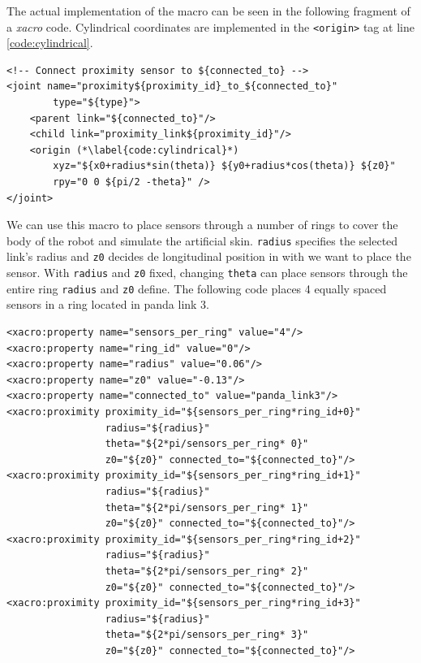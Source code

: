 The actual implementation of the macro can be seen in the following fragment of a \textit{xacro} code. Cylindrical coordinates are implemented in the \lstinline[columns=fixed]{<origin>} tag at line \ref{code:cylindrical}.

\begin{lstlisting}[caption={$<$joint$>$ element in the proximity macro, where the position of new sensor is set up given some arguments.},captionpos=b]
<!-- Connect proximity sensor to ${connected_to} -->
<joint name="proximity${proximity_id}_to_${connected_to}"
        type="${type}">
    <parent link="${connected_to}"/>
    <child link="proximity_link${proximity_id}"/>
    <origin (*\label{code:cylindrical}*)
        xyz="${x0+radius*sin(theta)} ${y0+radius*cos(theta)} ${z0}"
        rpy="0 0 ${pi/2 -theta}" />
</joint>
\end{lstlisting}

We can use this macro to place sensors through a number of rings to cover the body of the robot and simulate the artificial skin. \lstinline[columns=fixed]{radius} specifies the selected link's radius and \lstinline[columns=fixed]{z0} decides de longitudinal position in with we want to place the sensor. With \lstinline[columns=fixed]{radius} and \lstinline[columns=fixed]{z0} fixed, changing \lstinline[columns=fixed]{theta} can place sensors through the entire ring \lstinline[columns=fixed]{radius} and \lstinline[columns=fixed]{z0} define. The following code places 4 equally spaced sensors in a ring located in panda link 3.

\begin{lstlisting}[caption={Using the proximity macro to place sensors in a robot arm.},captionpos=b]
<xacro:property name="sensors_per_ring" value="4"/>
<xacro:property name="ring_id" value="0"/>
<xacro:property name="radius" value="0.06"/>
<xacro:property name="z0" value="-0.13"/>
<xacro:property name="connected_to" value="panda_link3"/>
<xacro:proximity proximity_id="${sensors_per_ring*ring_id+0}"
                 radius="${radius}"
                 theta="${2*pi/sensors_per_ring* 0}"
                 z0="${z0}" connected_to="${connected_to}"/>
<xacro:proximity proximity_id="${sensors_per_ring*ring_id+1}"
                 radius="${radius}"
                 theta="${2*pi/sensors_per_ring* 1}"
                 z0="${z0}" connected_to="${connected_to}"/>
<xacro:proximity proximity_id="${sensors_per_ring*ring_id+2}"
                 radius="${radius}"
                 theta="${2*pi/sensors_per_ring* 2}"
                 z0="${z0}" connected_to="${connected_to}"/>
<xacro:proximity proximity_id="${sensors_per_ring*ring_id+3}"
                 radius="${radius}"
                 theta="${2*pi/sensors_per_ring* 3}"
                 z0="${z0}" connected_to="${connected_to}"/>
\end{lstlisting}


